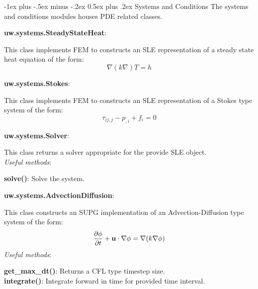 \documentclass[10pt,landscape]{article}
\makeatletter
\renewcommand{\section}{\@startsection{section}{1}{0mm}%
                                {-1ex plus -.5ex minus -.2ex}%
                                {0.5ex plus .2ex}%
                                {\normalfont\large\bfseries}}
\makeatother
\begin{document}
\begin{multicols}{2}
\section{Systems and Conditions}
The systems and conditions modules houses PDE related classes.\\
\vspace{1mm}

\noindent\textbf{uw.systems.SteadyStateHeat}:
\begin{addmargin}[1em]{2em}
This class implements FEM to constructs an SLE representation of a steady state heat equation of the form:
 \[\nabla(k \nabla)T = h\]
\end{addmargin}
\vspace{1mm}

\noindent\textbf{uw.systems.Stokes}:
\begin{addmargin}[1em]{2em}
This class implements FEM to constructs an SLE representation of a Stokes type system of the form:
 \[\tau_{ij,j} -  p_{,i} + f_i = 0\]
\end{addmargin}
\vspace{1mm}

\noindent\textbf{uw.systems.Solver}:
\begin{addmargin}[1em]{2em}
This class returns a solver appropriate for the provide SLE object.\\
\vspace{1mm}
\textit{Useful methods}:\\
\begin{addmargin}[1em]{2em}
\textbf{solve()}: Solve the system.\\
\end{addmargin}
\end{addmargin}
\vspace{1mm}

\noindent\textbf{uw.systems.AdvectionDiffusion}:
\begin{addmargin}[1em]{2em}
This class constructs an SUPG implementation of an Advection-Diffusion type system of the form:
 \[\frac{\partial\phi}{\partial t}  + {\bf u } \cdot \nabla \phi= \nabla { ( k  \nabla \phi } )\]
\textit{Useful methods}:\\
\begin{addmargin}[1em]{2em}
\textbf{get\_max\_dt()}: Returns a CFL type timestep size.\\
\textbf{integrate()}: Integrate forward in time for provided time interval.\\
\end{addmargin}
\end{addmargin}
\vspace{1mm}


\end{multicols}
\end{document}

